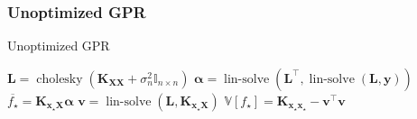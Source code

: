 \documentclass[9pt,hyperref={pdfpagelabels=false},xcolor=table]{beamer}
\begin{document}
\begin{frame}
    \frametitle{Unoptimized GPR}
    {\centering
        \begin{minipage}{.9\linewidth}
            \begin{algorithm}[H]
                \caption{Unoptimized GPR}
                \SetAlgoLined
                \DontPrintSemicolon

                \BlankLine
                $\bm{L} = \operatorname{cholesky} \left( \bm{K_{XX}} + \sigma_n^2 \mathbb{I}_{n \times n} \right)$\;
                $\bm{\alpha} = \operatorname{lin-solve} \left( \bm{L}^{\intercal} , \operatorname{lin-solve} \left( \bm{L}, \bm{y} \right) \right)$\;
                $\overline{f_{\star}} = \bm{K_{x_{\star} X}} \bm{\alpha}$\;
                $\bm{v} = \operatorname{lin-solve} \left( \bm{L}, \bm{K_{x_{\star} X}} \right)$\;
                $\mathbb{V} \left[ f_{\star} \right] = \bm{K_{x_{\star} x_{\star}}} - \bm{v}^{\intercal} \bm{v}$\;
                \BlankLine
            \end{algorithm}
        \end{minipage}
        \par
    }
\end{frame}
\end{document}
